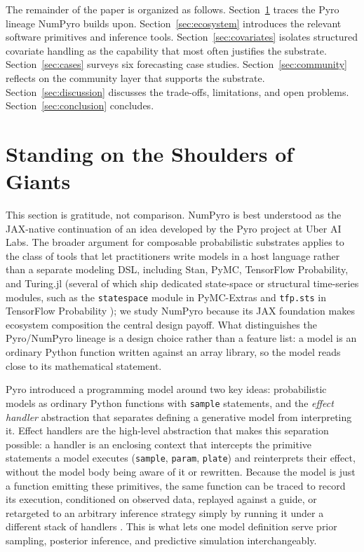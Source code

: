 \documentclass[11pt,3p,review,authoryear]{elsarticle}
\begin{document}
The remainder of the paper is organized as follows. Section~\ref{sec:giants} traces the Pyro lineage NumPyro builds upon. Section~\ref{sec:ecosystem} introduces the relevant software primitives and inference tools. Section~\ref{sec:covariates} isolates structured covariate handling as the capability that most often justifies the substrate. Section~\ref{sec:cases} surveys six forecasting case studies. Section~\ref{sec:community} reflects on the community layer that supports the substrate. Section~\ref{sec:discussion} discusses the trade-offs, limitations, and open problems. Section~\ref{sec:conclusion} concludes.


\section{Standing on the Shoulders of Giants}
\label{sec:giants}

This section is gratitude, not comparison. NumPyro is best understood as the JAX-native continuation of an idea developed by the Pyro project at Uber AI Labs. The broader argument for composable probabilistic substrates applies to the class of tools that let practitioners write models in a host language rather than a separate modeling DSL, including Stan, PyMC, TensorFlow Probability, and Turing.jl (several of which ship dedicated state-space or structural time-series modules, such as the \texttt{statespace} module in PyMC-Extras and \texttt{tfp.sts} in TensorFlow Probability \citep{pymc_extras_statespace, tfp_sts}); we study NumPyro because its JAX foundation makes ecosystem composition the central design payoff. What distinguishes the Pyro/NumPyro lineage is a design choice rather than a feature list: a model is an ordinary Python function written against an array library, so the model reads close to its mathematical statement.

Pyro \citep{bingham2019pyro} introduced a programming model around two key ideas: probabilistic models as ordinary Python functions with \texttt{sample} statements, and the \emph{effect handler} abstraction that separates defining a generative model from interpreting it. Effect handlers are the high-level abstraction that makes this separation possible: a handler is an enclosing context that intercepts the primitive statements a model executes (\texttt{sample}, \texttt{param}, \texttt{plate}) and reinterprets their effect, without the model body being aware of it or rewritten. Because the model is just a function emitting these primitives, the same function can be traced to record its execution, conditioned on observed data, replayed against a guide, or retargeted to an arbitrary inference strategy simply by running it under a different stack of handlers \citep{numpyro_effect_handlers}. This is what lets one model definition serve prior sampling, posterior inference, and predictive simulation interchangeably.
\end{document}
